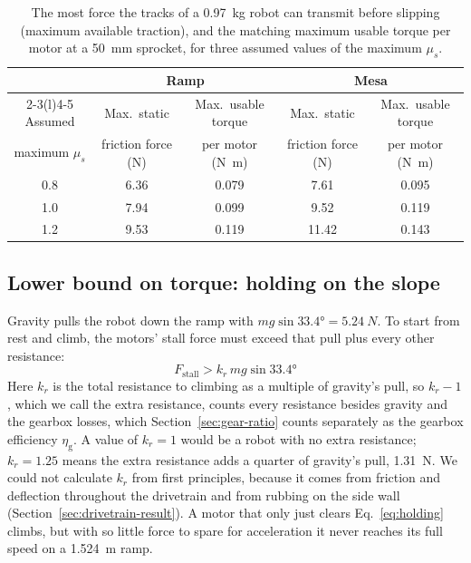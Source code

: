 \begin{table}[htbp]
  \centering
  \caption{The most force the tracks of a \qty{0.97}{kg} robot can transmit before slipping (maximum available traction), and the matching maximum usable torque per motor at a \qty{50}{mm} sprocket, for three assumed values of the maximum $\mu_s$.}
  \label{tab:traction}
  \begin{tabular}{@{}c cc cc@{}}
    \toprule
    & \multicolumn{2}{c}{Ramp} & \multicolumn{2}{c}{Mesa} \\
    \cmidrule(lr){2-3}\cmidrule(l){4-5}
    Assumed & Max.\ static & Max.\ usable torque & Max.\ static & Max.\ usable torque \\
    maximum $\mu_s$ & friction force (\unit{N}) & per motor (\unit{N.m}) & friction force (\unit{N}) & per motor (\unit{N.m}) \\
    \midrule
    0.8 & 6.36 & 0.079 & 7.61  & 0.095 \\
    1.0 & 7.94 & 0.099 & 9.52  & 0.119 \\
    1.2 & 9.53 & 0.119 & 11.42 & 0.143 \\
    \bottomrule
  \end{tabular}
\end{table}

\subsection{Lower bound on torque: holding on the slope}
\label{sec:holding-bound}

Gravity pulls the robot down the ramp with $m g \sin\ang{33.4} = \qty{5.24}{N}$. To start from rest and climb, the motors' stall force must exceed that pull plus every other resistance:
\begin{equation}
  F_\mathrm{stall} > k_r\, m g \sin\ang{33.4}
  \label{eq:holding}
\end{equation}
Here $k_r$ is the total resistance to climbing as a multiple of gravity's pull, so $k_r - 1$, which we call the extra resistance, counts every resistance besides gravity and the gearbox losses, which Section~\ref{sec:gear-ratio} counts separately as the gearbox efficiency $\eta_\mathrm{g}$. A value of $k_r = 1$ would be a robot with no extra resistance; $k_r = 1.25$ means the extra resistance adds a quarter of gravity's pull, \qty{1.31}{N}. We could not calculate $k_r$ from first principles, because it comes from friction and deflection throughout the drivetrain and from rubbing on the side wall (Section~\ref{sec:drivetrain-result}). A motor that only just clears Eq.~\eqref{eq:holding} climbs, but with so little force to spare for acceleration it never reaches its full speed on a \qty{1.524}{m} ramp.

